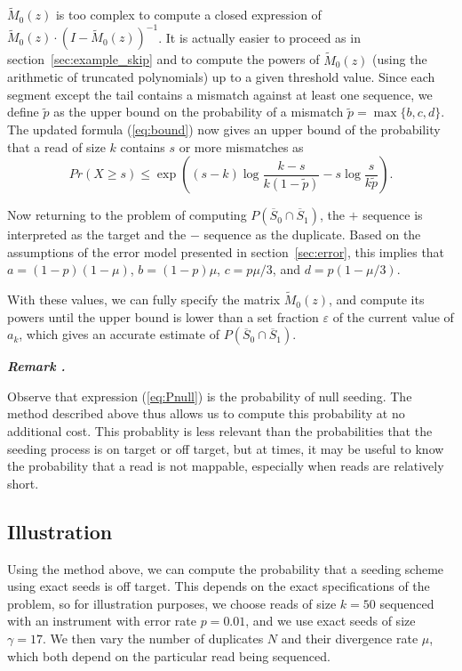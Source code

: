 \documentclass{article}
\newcounter{remarkcounter}
\newenvironment{remark}
{\small\it\vspace{0.5\baselineskip}
  \refstepcounter{remarkcounter}%
  \noindent\textbf{Remark \arabic{remarkcounter}.}%
}{\vspace{0.5\baselineskip}}
\begin{document}
$\tilde{M}_0(z)$ is too complex to compute a closed expression of
$\tilde{M}_0(z)\cdot(I-\tilde{M}_0(z))^{-1}$. It is actually easier to
proceed as in section~\ref{sec:example_skip} and to compute the powers of
$\tilde{M}_0(z)$ (using the arithmetic of truncated polynomials) up to a
given threshold value. Since each segment except the tail contains a
mismatch against at least one sequence, we define $\tilde{p}$ as the upper
bound on the probability of a mismatch $\tilde{p} = \max\{b,c,d\}$. The
updated formula (\ref{eq:bound}) now gives an upper bound of the
probability that a read of size $k$ contains $s$ or more mismatches as
\begin{equation*}
Pr(X \geq s) \leq \exp \left( (s-k)\log \frac{k-s}{k(1-\tilde{p})} -s\log
\frac{s}{k\tilde{p}} \right).
\end{equation*}

Now returning to the problem of computing $P(\overline{S}_0 \cap
\overline{S}_1)$, the $+$ sequence is interpreted as the target and the
$-$ sequence as the duplicate. Based on the assumptions of the error model
presented in section~\ref{sec:error}, this implies that $a =
(1-p)(1-\mu)$, $b = (1-p)\mu$, $c = p\mu/3$, and $d = p(1-\mu/3)$.

With these values, we can fully specify the matrix $\tilde{M}_0(z)$, and
compute its powers until the upper bound is lower than a set fraction
$\varepsilon$ of the current value of $a_k$, which gives an accurate
estimate of $P(\overline{S}_0 \cap \overline{S}_1)$.


\begin{remark}
Observe that expression (\ref{eq:Pnull}) is the probability of null
seeding. The method described above thus allows us to compute this
probability at no additional cost. This probablity is less relevant than
the probabilities that the seeding process is on target or off target, but
at times, it may be useful to know the probability that a read is
not mappable, especially when reads are relatively short.
\end{remark}


\subsection{Illustration}
\label{sec:illdual}

Using the method above, we can compute the probability that a seeding
scheme using exact seeds is off target. This depends on the exact
specifications of the problem, so for illustration purposes, we choose
reads of size $k=50$ sequenced with an instrument with error rate
$p=0.01$, and we use exact seeds of size $\gamma=17$. We then vary the
number of duplicates $N$ and their divergence rate $\mu$, which both
depend on the particular read being sequenced.
\end{document}
